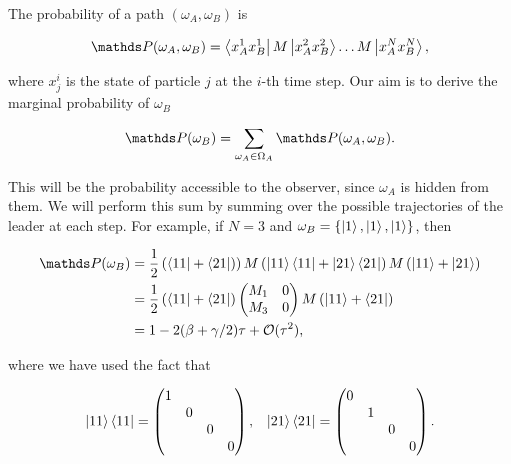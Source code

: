The probability of a path $(\omega_A, \omega_B)$ is 

\begin{align}
\bP(\omega_A, \omega_B) = \bra{x^1_Ax^1_B}M\ket{x^2_Ax^2_B}\ldots M\ket{x^N_Ax^N_B},
\end{align}

where $x^i_j$ is the state of particle $j$ at the $i$-th time step. Our aim is to derive the marginal probability of $\omega_B$ 

\begin{align}
\bP(\omega_B) = \sum_{\omega_A \in \Omega_A} \bP(\omega_A,\omega_B).
\end{align}

This will be  the probability accessible to the observer, since $\omega_A$ is hidden from them. We will perform this sum by summing over the possible trajectories of the leader at each step. For example, if $N=3$ and $\omega_B = \{\ket{1},\ket{1} , \ket{1}\} $, then

\begin{align}\label{path-prob-example}
\begin{split}
\bP(\omega_B) &= \frac{1}{2}\left (\bra{11} + \bra{21}) \right)M\left(\ket{11}\bra{11} + \ket{21}\bra{21}\right)M\left (\ket{11} + \ket{21} \right)\\
&= \frac{1}{2} \left (\bra{11} + \bra{21}\right) \begin{pmatrix}M_1 & 0 \\ 
M_3 & 0\end{pmatrix}M\left (\ket{11} + \bra{21} \right)\\ 
&= 1-2(\beta + \gamma/2)\tau + \mathcal{O}(\tau^2),
\end{split}
\end{align}

where we have used the fact that

\begin{align}
\ket{11}\bra{11} = \begin{pmatrix} 1 & & & \\ 
& 0 & & \\ 
& & 0 & \\ 
& & & 0\end{pmatrix}, \; \; \; \ket{21}\bra{21} = \begin{pmatrix} 0 & & & \\ 
& 1 & & \\ 
& & 0 & \\ 
& & & 0\end{pmatrix}.
\end{align}


